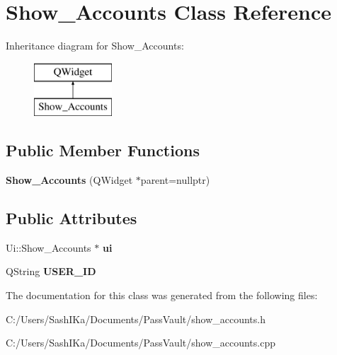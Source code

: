 \hypertarget{class_show___accounts}{}\section{Show\+\_\+\+Accounts Class Reference}
\label{class_show___accounts}
Inheritance diagram for Show\+\_\+\+Accounts\+:\begin{figure}[H]
\begin{center}
\leavevmode
\includegraphics[height=2.000000cm]{class_show___accounts}
\end{center}
\end{figure}
\subsection*{Public Member Functions}
\begin{DoxyCompactItemize}
\item 
\mbox{\label{class_show___accounts_aa14b771f0bdd53d766a76ab08bfea385}} 
{\bfseries Show\+\_\+\+Accounts} (Q\+Widget $\ast$parent=nullptr)
\end{DoxyCompactItemize}
\subsection*{Public Attributes}
\begin{DoxyCompactItemize}
\item 
\mbox{\label{class_show___accounts_ac3a217eb882f512e027f00921112e4cb}} 
Ui\+::\+Show\+\_\+\+Accounts $\ast$ {\bfseries ui}
\item 
\mbox{\label{class_show___accounts_ae49be63a395a2df05a0f3f112a035652}} 
Q\+String {\bfseries U\+S\+E\+R\+\_\+\+ID}
\end{DoxyCompactItemize}


The documentation for this class was generated from the following files\+:\begin{DoxyCompactItemize}
\item 
C\+:/\+Users/\+Sash\+I\+Ka/\+Documents/\+Pass\+Vault/show\+\_\+accounts.\+h\item 
C\+:/\+Users/\+Sash\+I\+Ka/\+Documents/\+Pass\+Vault/show\+\_\+accounts.\+cpp\end{DoxyCompactItemize}
